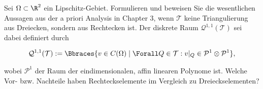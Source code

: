
\begin{exercise}

Sei $\Omega \subset \R^2$ ein Lipschitz-Gebiet.
Formulieren und beweisen Sie die wesentlichen Aussagen aus der a priori Analysis in Chapter 3, wenn $\mathcal{T}$ keine Triangulierung aus Dreiecken, sondern aus Rechtecken ist.
Der diskrete Raum $\mathcal{Q}^{1, 1}(\mathcal{T})$ sei dabei definiert durch

\begin{align}
  \mathcal{Q}^{1, 1}(\mathcal{T})
  :=
  \Bbraces
  {
    v \in C(\Omega)
    \mid
    \Forall Q \in \mathcal{T}:
    v|_Q \in \mathcal{P}^1 \otimes \mathcal{P}^1
  },
\end{align}

wobei $\mathcal{P}^1$ der Raum der eindimensionalen, affin linearen Polynome ist.
Welche Vor- bzw. Nachteile haben Rechteckselemente im Vergleich zu Dreieckselementen?

\end{exercise}


